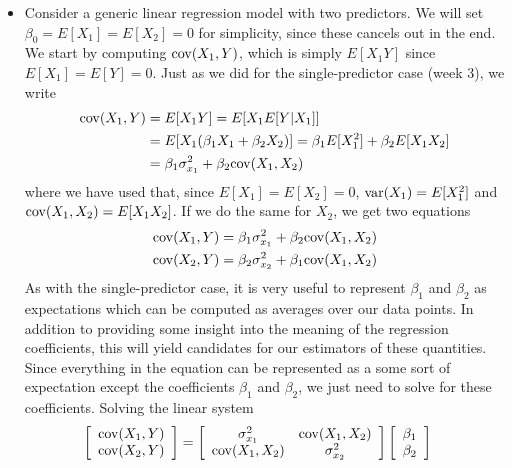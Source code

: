 \begin{itemize}
\item Consider a generic linear regression model with two predictors. We will set $\beta_0=E[X_1]=E[X_2]=0$ for simplicity, since these cancels out in the end. We start by computing ${\rm cov}(X_1,Y)$, which is simply $E[X_1Y]$ since $E[X_1]=E[Y] = 0$. 
Just as we did for the single-predictor case (week 3), we write
\begin{align*}
{\rm cov}(X_1,Y) &= E[X_1Y] = E[X_1E[Y|X_1]] \\
&= E[X_1(\beta_1 X_1 + \beta_2 X_2)] = \beta_1 E[X_1^2] + \beta_2 E[X_1X_2]\\
&= \beta_1 \sigma_{x_1}^2  + \beta_2 {\rm cov}(X_1,X_2)
\end{align*}
where we have used that, since $E[X_1]=E[X_2]=0$, ${\rm var}(X_1) = E[X_1^2]$ and ${\rm cov}(X_1,X_2) = E[X_1X_2]$.
 If we do the same for $X_2$, we get two equations
 \begin{align*}
 {\rm cov}(X_1,Y)  &= \beta_1 \sigma_{x_1}^2  + \beta_2 {\rm cov}(X_1,X_2)\\
{\rm cov}(X_2,Y) &=   \beta_2 \sigma_{x_2}^2  + \beta_1 {\rm cov}(X_1,X_2)
 \end{align*}
As with the single-predictor case, it is very useful to represent $\beta_1$ and $\beta_2$ as expectations which can be computed as averages over our data points. In addition to providing some insight into the meaning of the regression coefficients, this will yield candidates for our estimators of these quantities. 
Since everything in the equation can be represented as a some sort of expectation except the coefficients $\beta_1$ and $\beta_2$, we just need to solve for these coefficients. Solving the linear system  
\begin{align*}
\left[\begin{array}{c}
{\rm cov}(X_1,Y) \\
{\rm cov}(X_2,Y)  
\end{array}\right] &= \left[\begin{array}{cc}
\sigma_{x_1}^2 & {\rm cov}(X_1,X_2)\\
 {\rm cov}(X_1,X_2) & \sigma_{x_2}^2
 \end{array} \right]\left[ \begin{array}{c}
\beta_1\\
  \beta_2\\
  \end{array}\right]

\end{align*}
\end{itemize}
